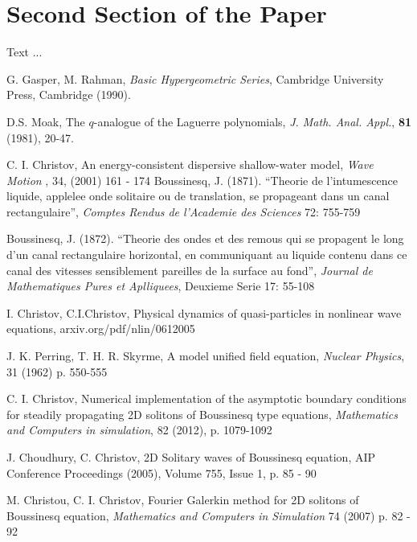 \documentclass[12pt]{article}
\theoremstyle{theorem}
\theoremstyle{defi}
\begin{document}
\section{Second Section of the Paper}

Text ...

\begin{thebibliography}{99}

 G. Gasper, M. Rahman,
{\it Basic Hypergeometric Series}, Cambridge University Press, Cambridge (1990).

 D.S. Moak,
The $q$-analogue of the Laguerre polynomials, {\it J. Math. Anal. Appl.}, {\bf 81} (1981), 20-47.

 C. I. Christov, An energy-consistent dispersive shallow-water model,  {\it Wave Motion }, 34, (2001) 161 - 174
 Boussinesq, J. (1871). “Theorie de l’intumescence liquide, applelee onde solitaire ou de translation, se propageant dans un canal rectangulaire”,  {\it Comptes Rendus de l’Academie des Sciences } 72: 755-759

 Boussinesq, J. (1872). “Theorie des ondes et des remous qui se propagent le long d’un canal rectangulaire horizontal, en communiquant au liquide contenu dans ce canal des vitesses sensiblement pareilles de la surface au fond”, {\it Journal de Mathematiques Pures et Aplliquees}, Deuxieme Serie 17: 55-108

 I. Christov, C.I.Christov, Physical dynamics of quasi-particles in nonlinear wave equations, arxiv.org/pdf/nlin/0612005

 J. K. Perring, T. H. R. Skyrme, A model unified field equation, {\it Nuclear Physics},  31 (1962) p. 550-555 

  C. I. Christov, Numerical implementation of the asymptotic boundary conditions for steadily propagating 2D solitons of Boussinesq type equations, {\it Mathematics and Computers in simulation}, 82 (2012), p. 1079-1092

  J. Choudhury, C. Christov, 2D Solitary waves of Boussinesq equation, AIP Conference Proceedings (2005), Volume 755, Issue 1, p. 85 - 90

  M. Christou, C. I. Christov, Fourier Galerkin method for 2D solitons of Boussinesq equation,  {\it Mathematics and Computers in Simulation} 74 (2007) p. 82 - 92


\end{thebibliography}
\end{document}
